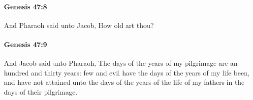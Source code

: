 		\paragraph{Genesis 47:8} %
			\label{GENESIS-47-8}

			And Pharaoh said unto Jacob, How old art thou?


		\paragraph{Genesis 47:9} %
			\label{GENESIS-47-9}

			And Jacob said unto Pharaoh, The days of the years of my pilgrimage are an hundred and thirty years: few and evil have the days of the years of my life been, and have not attained unto the days of the years of the life of my fathers in the days of their pilgrimage.



